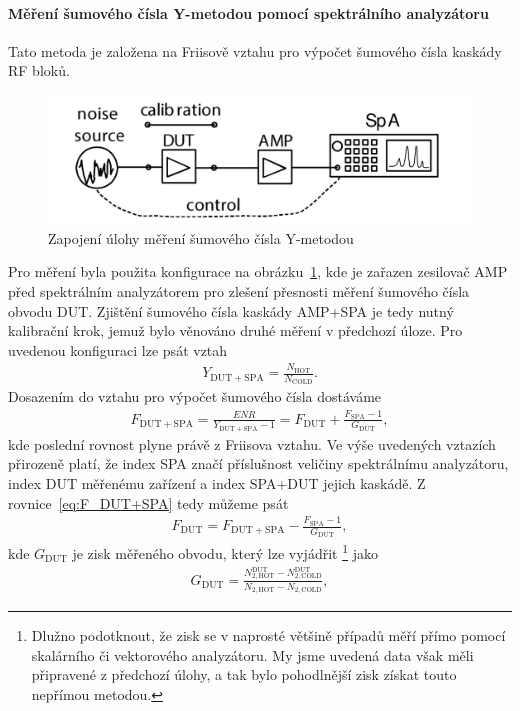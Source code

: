 \documentclass[11pt,a4paper]{article}
\begin{document}
\paragraph*{Měření šumového čísla Y-metodou pomocí spektrálního analyzátoru} Tato metoda je založena na Friisově vztahu pro výpočet šumového čísla kaskády RF bloků.
\begin{figure}[!ht]
    \centering
    \includegraphics[width=.65\textwidth]{src/task2-zapojeni.png}
    \caption{Zapojení úlohy měření šumového čísla Y-metodou}
    \label{fig:task2-zapojeni}
\end{figure}
Pro měření byla použita konfigurace na obrázku~\ref{fig:task2-zapojeni}, kde je zařazen zesilovač AMP před spektrálním analyzátorem pro zlešení přesnosti měření šumového čísla obvodu DUT. Zjištění šumového čísla kaskády AMP+SPA je tedy nutný kalibrační krok, jemuž bylo věnováno druhé měření v předchozí úloze. Pro uvedenou konfiguraci lze psát vztah
\begin{align}
    Y_{\mathrm{DUT+SPA}} = \frac{N_{\mathrm{HOT}}}{N_{\mathrm{COLD}}}.
\end{align}
Dosazením do vztahu pro výpočet šumového čísla dostáváme
\begin{align}
    \label{eq:F_DUT+SPA}
    F_{\mathrm{DUT+SPA}} = \frac{ENR}{Y_{\mathrm{DUT+SPA}}-1} = F_{\mathrm{DUT}} + \frac{F_{\mathrm{SPA}} - 1}{G_{\mathrm{DUT}}},
\end{align}
kde poslední rovnost plyne právě z Friisova vztahu. Ve výše uvedených vztazích přirozeně platí, že index SPA značí příslušnost veličiny spektrálnímu analyzátoru, index DUT měřenému zařízení a index SPA+DUT jejich kaskádě. Z rovnice~\ref{eq:F_DUT+SPA} tedy můžeme psát
\begin{align}
    F_{\mathrm{DUT}} = F_{\mathrm{DUT+SPA}} - \frac{F_{\mathrm{SPA}}-1}{G_{\mathrm{DUT}}},
\end{align}
kde $G_{\mathrm{DUT}}$ je zisk měřeného obvodu, který lze vyjádřit%
    \footnote{Dlužno podotknout, že zisk se v naprosté většině případů měří přímo pomocí skalárního či vektorového analyzátoru. My jsme uvedená data však měli připravené z předchozí úlohy, a tak bylo pohodlnější zisk získat touto nepřímou metodou.}
jako
\begin{align}
    G_{\mathrm{DUT}} = \frac{N_{2,\mathrm{HOT}}^{\mathrm{DUT}} - N_{2,\mathrm{COLD}}^{\mathrm{DUT}}}{N_{2,\mathrm{HOT}} - N_{2,\mathrm{COLD}}},
\end{align}
\end{document}
